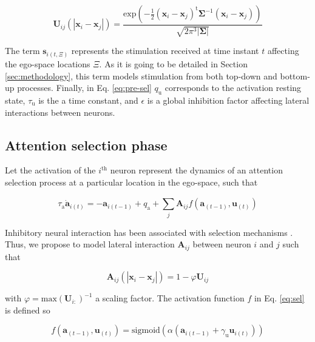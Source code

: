 \documentclass[letterpaper, 10 pt, conference]{ieeeconf}  %
\begin{document}
	\begin{equation}
		\mathbf{U}_{ij}(|\mathbf{x}_i-\mathbf{x}_j|) = \frac{\mathrm{exp}\left(-\frac{1}{2} (\mathbf{x}_i-\mathbf{x}_j)^{\mathrm{t}}\mathbf{\Sigma}^{-1}(\mathbf{x}_i-\mathbf{x}_j)\right)}{\sqrt{2\pi^{3}|\mathbf{\Sigma}|}}	
	\label{eq:pre-sel-syn}
	\end{equation}
	
	The term $\mathbf{s}_{i(t,\Xi)}$ represents the stimulation received at time instant $t$ affecting the ego-space locations $\Xi$. As it is going to be detailed in Section \ref{sec:methodology}, this term models stimulation from both top-down and bottom-up processes. Finally, in Eq. \eqref{eq:pre-sel} $q_\mathrm{u}$ corresponds to the activation resting state, $\tau_\mathrm{u}$ is the a time constant, and $\epsilon$ is a global inhibition factor affecting lateral interactions between neurons.
	 
	\subsection{Attention selection phase}
	
	Let the activation of the $i^\mathrm{th}$ neuron represent the dynamics of an attention selection process at a particular location in the ego-space, such that 
	
	\begin{equation}
	\tau_\mathrm{a} \dot{\mathbf{a}}_{i(t)} = -\mathbf{a}_{i(t-1)} + q_\mathrm{a} + \sum_{j}^{} \mathbf{A}_{ij}f\left(\mathbf{a}_{(t-1)}, \mathbf{u}_{(t)}\right) 
	\label{eq:sel}
	\end{equation}
	
	\noindent Inhibitory neural interaction has been associated with selection mechanisms \cite{schoner2016}. Thus, we propose to model lateral interaction $\mathbf{A}_{ij}$ between neuron $i$ and $j$ such that

	\begin{equation}
	\mathbf{A}_{ij}(|\mathbf{x}_i-\mathbf{x}_j|) = 1 - \varphi\mathbf{U}_{ij}	
	\label{eq:sel-syn}
	\end{equation}
	
	\noindent with $\varphi = \mathrm{max}(\mathbf{U}_{i:})^{-1}$ a scaling factor. The activation function $f$ in Eq. \eqref{eq:sel} is defined so

	\begin{equation}
	f\left(\mathbf{a}_{(t-1)}, \mathbf{u}_{(t)}\right) = \mathrm{sigmoid} \left(\alpha \left(\mathbf{a}_{i(t-1)} + \gamma_\mathrm{u} \mathbf{u}_{i(t)}\right)\right)
	\label{eq:sel-fa}
	\end{equation}
	
\end{document}
